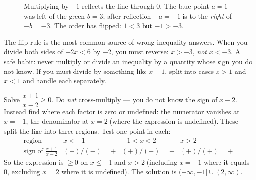 \begin{figure}[htbp]
\centering
{}
\caption{Multiplying by $-1$ reflects the line through $0$. The blue point $a=1$
was left of the green $b=3$; after reflection $-a=-1$ is to the \emph{right} of
$-b=-3$. The order has flipped: $1<3$ but $-1>-3$.}
\label{ch40:fig-flip}
\end{figure}

\begin{trapbox}
The flip rule is the most common source of wrong inequality answers. When you
divide both sides of $-2x < 6$ by $-2$, you must reverse: $x > -3$, \emph{not}
$x<-3$. A safe habit: never multiply or divide an inequality by a quantity whose
sign you do not know. If you must divide by something like $x-1$, split into cases
$x>1$ and $x<1$ and handle each separately.
\end{trapbox}

\begin{example}
\label{ch40:ex-rational-ineq}
Solve $\dfrac{x+1}{x-2} \ge 0$. Do \emph{not} cross-multiply --- you do not know
the sign of $x-2$. Instead find where each factor is zero or undefined: the
numerator vanishes at $x=-1$, the denominator at $x=2$ (where the expression is
undefined). These split the line into three regions. Test one point in each:
\[
  \begin{array}{c|ccc}
    \text{region} & x<-1 & -1<x<2 & x>2 \\\hline
    \text{sign of } \tfrac{x+1}{x-2} & (-)/(-)=+ & (+)/(-)=- & (+)/(+)=+
  \end{array}
\]
So the expression is $\ge 0$ on $x \le -1$ and $x > 2$ (including $x=-1$ where it
equals $0$, excluding $x=2$ where it is undefined). The solution is
$(-\infty,-1] \cup (2,\infty)$.
\end{example}

